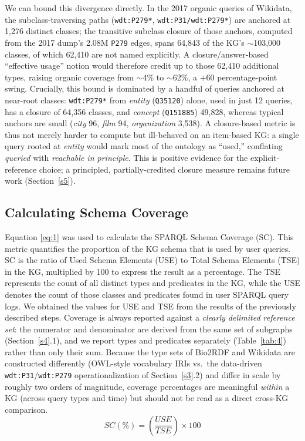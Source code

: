\documentclass[sw]{iosart2x}
\begin{document}
We can bound this divergence directly. In the 2017 organic queries of Wikidata, the subclass-traversing paths (\texttt{wdt:P279*}, \texttt{wdt:P31/wdt:P279*}) are anchored at 1,276 distinct classes; the transitive subclass closure of those anchors, computed from the 2017 dump's 2.08M \texttt{P279} edges, spans 64,843 of the KG's $\sim$103,000 classes, of which 62,410 are not named explicitly. A closure/answer-based ``effective usage'' notion would therefore credit up to those 62,410 additional types, raising organic coverage from $\sim$4\% to $\sim$62\%, a $+60$ percentage-point swing. Crucially, this bound is dominated by a handful of queries anchored at near-root classes: \texttt{wdt:P279*} from \emph{entity} (\texttt{Q35120}) alone, used in just 12 queries, has a closure of 64,356 classes, and \emph{concept} (\texttt{Q151885}) 49,828, whereas typical anchors are small (\emph{city} 96, \emph{film} 94, \emph{organization} 3,538). A closure-based metric is thus not merely harder to compute but ill-behaved on an item-based KG: a single query rooted at \emph{entity} would mark most of the ontology as ``used,'' conflating \emph{queried} with \emph{reachable in principle}. This is positive evidence for the explicit-reference choice; a principled, partially-credited closure measure remains future work (Section~\ref{s5}).

\subsection{Calculating Schema Coverage}
Equation \ref{eq:1} was used to calculate the SPARQL Schema Coverage (SC). This metric quantifies the proportion of the KG schema that is used by user queries. SC is the ratio of Used Schema Elements (USE) to Total Schema Elements (TSE) in the KG, multiplied by 100 to express the result as a percentage. The TSE represents the count of all distinct types and predicates in the KG, while the USE denotes the count of those classes and predicates found in user SPARQL query logs. We obtained the values for USE and TSE from the results of the previously described steps. Coverage is always reported against a \emph{clearly delimited reference set}: the numerator and denominator are derived from the same set of subgraphs (Section~\ref{s4}.1), and we report types and predicates separately (Table~\ref{tab:4}) rather than only their sum. Because the type sets of Bio2RDF and Wikidata are constructed differently (OWL-style vocabulary IRIs vs.\ the data-driven \texttt{wdt:P31}/\texttt{wdt:P279} operationalization of Section~\ref{s3}.2) and differ in scale by roughly two orders of magnitude, coverage percentages are meaningful \emph{within} a KG (across query types and time) but should not be read as a direct cross-KG comparison.
\begin{equation}
SC (\%) = \left( \frac{USE}{TSE} \right) \times 100
\label{eq:1}
\end{equation}
\end{document}
